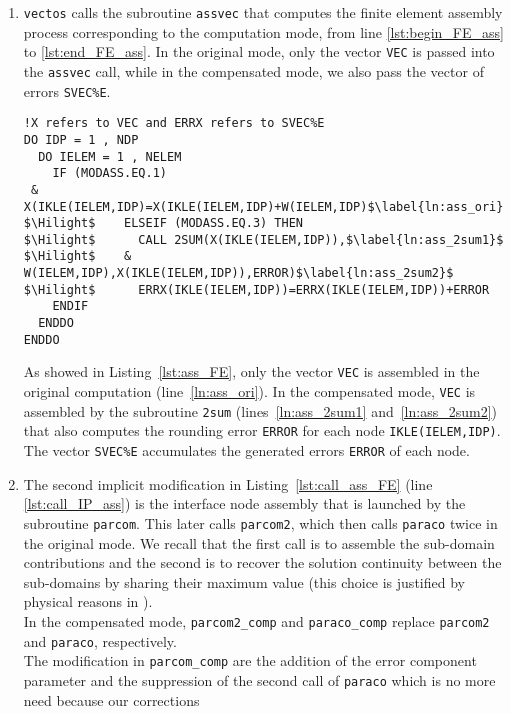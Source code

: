 \begin{enumerate}
\item  \texttt{vectos} calls the subroutine \texttt{assvec} that computes
the finite element assembly process corresponding to the computation mode,
from line \ref{lst:begin_FE_ass} to \ref{lst:end_FE_ass}.
In the original mode, only the vector \texttt{VEC} is passed into the \texttt{assvec} call,
while in the compensated mode, we also pass the
vector of errors \texttt{SVEC\%E}.
%
\begin{lstlisting}[language=TelFortran, caption={The FE assembly in \texttt{assvec}},label={lst:ass_FE},escapechar=\$]
!X refers to VEC and ERRX refers to SVEC%E
DO IDP = 1 , NDP
  DO IELEM = 1 , NELEM
    IF (MODASS.EQ.1)
 &   X(IKLE(IELEM,IDP)=X(IKLE(IELEM,IDP)+W(IELEM,IDP)$\label{ln:ass_ori}$
$\Hilight$    ELSEIF (MODASS.EQ.3) THEN
$\Hilight$      CALL 2SUM(X(IKLE(IELEM,IDP)),$\label{ln:ass_2sum1}$
$\Hilight$    &   W(IELEM,IDP),X(IKLE(IELEM,IDP)),ERROR)$\label{ln:ass_2sum2}$
$\Hilight$      ERRX(IKLE(IELEM,IDP))=ERRX(IKLE(IELEM,IDP))+ERROR
    ENDIF
  ENDDO
ENDDO
\end{lstlisting}
%
As showed in Listing~\ref{lst:ass_FE},
only the vector \texttt{VEC} is assembled in the original computation (line~\ref{ln:ass_ori}).
In the compensated mode, \texttt{VEC} is assembled by the
subroutine \texttt{2sum} (lines~\ref{ln:ass_2sum1} and~\ref{ln:ass_2sum2})
that also computes the rounding error \texttt{ERROR}
for each node \texttt{IKLE(IELEM,IDP)}. The vector \texttt{SVEC\%E} accumulates
the generated errors \texttt{ERROR} of each node.
%
\item \label{item:2IPmodif} The second implicit modification in Listing~\ref{lst:call_ass_FE} (line \ref{lst:call_IP_ass})
is the interface node assembly that is launched by the subroutine \texttt{parcom}.
This later calls \texttt{parcom2}, which then calls \texttt{paraco} twice
in the original mode. We recall that the first call is to assemble
the sub-domain contributions and the second is to recover the solution continuity
between the sub-domains by sharing their maximum value
(this choice is justified by physical reasons in \cite{Hervouet2007}). \\
%
In the compensated mode,
\texttt{parcom2\_comp} and \texttt{paraco\_comp} replace
\texttt{parcom2} and \texttt{paraco}, respectively.\\
%
The modification in \texttt{parcom\_comp} are the addition of the
error component parameter and  the suppression of the second call of
\texttt{paraco} which is no more need because our corrections

\end{enumerate}
